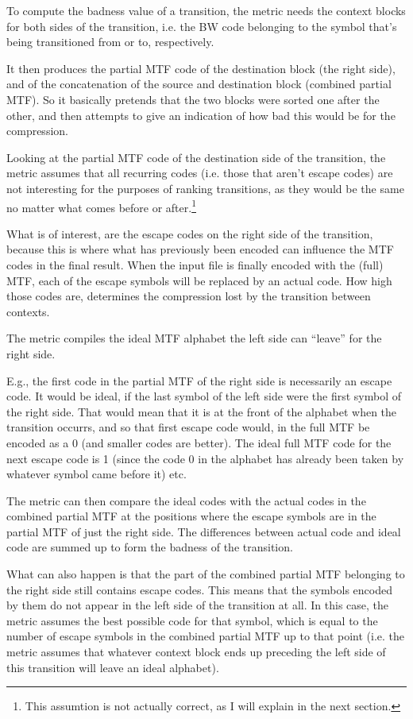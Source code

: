 \documentclass[a4paper]{scrreprt}
\begin{document}
To compute the badness value of a transition, the metric needs the context
blocks for both sides of the transition, i.e. the BW code belonging to the
symbol that's being transitioned from or to, respectively.

It then produces the partial MTF code of the destination block (the right
side), and of the concatenation of the source and destination block (combined
partial MTF).
So it  basically pretends that the two blocks were sorted one after the other,
and then attempts to give an indication of how bad this would be for the
compression.

Looking at the partial MTF code of the destination side of the transition, the
metric assumes that all recurring codes (i.e. those that aren't escape codes)
are not interesting for the purposes of ranking transitions, as they would be
the same no matter what comes before or after.\footnote{This assumtion is not
actually correct, as I will explain in the next section.}

What is of interest, are the escape codes on the right side of the transition,
because this is where what has previously been encoded can influence the MTF
codes in the final result. When the input file is finally encoded with the
(full) MTF, each of the escape symbols will be replaced by an actual code. How
high those codes are, determines the compression lost by the transition between
contexts.

The metric compiles the ideal MTF alphabet the left side can ``leave'' for the
right side.

E.g., the first code in the partial MTF of the right side is necessarily an
escape code. It would be ideal, if the last symbol of the left side were the
first symbol of the right side. That would mean that it is at the front of the
alphabet when the transition occurrs, and so that first escape code would, in
the full MTF be encoded as a 0 (and smaller codes are better). The ideal full
MTF code for the next escape code is 1 (since the code 0 in the alphabet has
already been taken by whatever symbol came before it) etc.

The metric can then compare the ideal codes with the actual codes in the
combined partial MTF at the positions where the escape symbols are in the
partial MTF of just the right side. The differences between actual code and
ideal code are summed up to form the badness of the transition.

What can also happen is that the part of the combined partial MTF belonging to
the right side still contains escape codes. This means that the symbols encoded
by them do not appear in the left side of the transition at all. In this case,
the metric assumes the best possible code for that symbol, which is equal to the
number of escape symbols in the combined partial MTF up to that point (i.e. the
metric assumes that whatever context block ends up preceding the left side
of this transition will leave an ideal alphabet).
\end{document}
